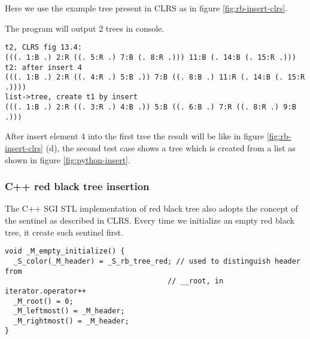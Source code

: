 \documentclass{article}
\begin{document}
Here we use the example tree present in CLRS as in figure \ref{fig:rb-insert-clrs}.


The program will output 2 trees in console.

\begin{verbatim}
t2, CLRS fig 13.4:
(((. 1:B .) 2:R ((. 5:R .) 7:B (. 8:R .))) 11:B (. 14:B (. 15:R .)))
t2: after insert 4
(((. 1:B .) 2:R ((. 4:R .) 5:B .)) 7:B ((. 8:B .) 11:R (. 14:B (. 15:R .))))
list->tree, create t1 by insert
(((. 1:B .) 2:R ((. 3:R .) 4:B .)) 5:B ((. 6:B .) 7:R ((. 8:R .) 9:B .)))
\end{verbatim}

After insert element 4 into the first tree the result will be like in figure \ref{fig:rb-insert-clrs} (d), the second test case shows a tree which is created from a list as shown in figure \ref{fig:python-insert}.


\subsubsection*{C++ red black tree insertion}

The C++ SGI STL implementation of red black tree also adopts the
concept of the sentinel as described in CLRS. Every time we initialize
an empty red black tree, it create such sentinel first.

\lstset{language=c++}
\begin{lstlisting}
void _M_empty_initialize() {
  _S_color(_M_header) = _S_rb_tree_red; // used to distinguish header from 
                                      // __root, in iterator.operator++
  _M_root() = 0;
  _M_leftmost() = _M_header;
  _M_rightmost() = _M_header;
}
\end{lstlisting}
\end{document}
